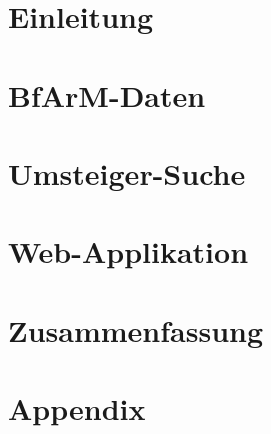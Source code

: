 \documentclass[german,version-2020-11]{uzl-thesis}
\begin{document}
%

\chapter{Einleitung} 

\chapter{BfArM-Daten} 

\chapter{Umsteiger-Suche} 

\chapter{Web-Applikation} 

\chapter{Zusammenfassung}  


\appendix
\chapter{Appendix}

%
\newpage

\newpage

\end{document}
